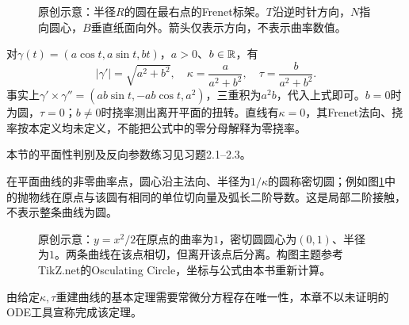 \begin{figure}[htbp]
\centering

\caption{原创示意：半径$R$的圆在最右点的Frenet标架。$T$沿逆时针方向，$N$指向圆心，$B$垂直纸面向外。箭头仅表示方向，不表示曲率数值。}
\end{figure}
\begin{example}[圆、螺旋线与退化点]
对$\gamma(t)=(a\cos t,a\sin t,bt)$，$a>0$、$b\in\mathbb{R}$，有
\[
 |\gamma'|=\sqrt{a^2+b^2},\quad
 \kappa=\frac{a}{a^2+b^2},\quad \tau=\frac{b}{a^2+b^2}.
\]
事实上$\gamma'\times\gamma''=(ab\sin t,-ab\cos t,a^2)$，三重积为$a^2b$，代入上式即可。$b=0$时为圆，$\tau=0$；$b\ne0$时挠率测出离开平面的扭转。直线有$\kappa=0$，其Frenet法向、挠率按本定义均未定义，不能把公式中的零分母解释为零挠率。
\end{example}
本节的平面性判别及反向参数练习见习题2.1--2.3。

在平面曲线的非零曲率点，圆心沿主法向、半径为$1/\kappa$的圆称密切圆；例如图\ref{fig:osculating-parabola}中的抛物线在原点与该圆有相同的单位切向量及弧长二阶导数。这是局部二阶接触，不表示整条曲线为圆。
\begin{figure}[htbp]
\centering

\caption{原创示意：$y=x^2/2$在原点的曲率为$1$，密切圆圆心为$(0,1)$、半径为$1$。两条曲线在该点相切，但离开该点后分离。构图主题参考TikZ.net的Osculating Circle，坐标与公式由本书重新计算。}
\label{fig:osculating-parabola}
\end{figure}

由给定$\kappa,\tau$重建曲线的基本定理需要常微分方程存在唯一性，本章不以未证明的ODE工具宣称完成该定理。
